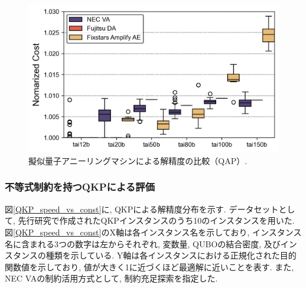 \documentclass[submit,techrep,noauthor]{ipsj}
\begin{document}


\begin{figure}[hb]
\centering
\includegraphics[bb=0 0 700 230, width=15cm]{speed_vs_constraint_QAP.png}
\caption{擬似量子アニーリングマシンによる解精度の比較（QAP）.}
\label{QAP_speed_vs_const}
\end{figure}

\subsubsection{不等式制約を持つQKPによる評価}
図\ref{QKP_speed_vs_const}に, QKPによる解精度分布を示す. データセットとして, 先行研究\cite{qkplib}で作成されたQKPインスタンスのうち10のインスタンスを用いた. 図\ref{QKP_speed_vs_const}のX軸は各インスタンス名を示しており, インスタンス名に含まれる3つの数字は左からそれぞれ, 変数量, QUBOの結合密度, 及びインスタンスの種類を示している. Y軸は各インスタンスにおける正規化された目的関数値を示しており, 値が大きく1に近づくほど最適解に近いことを表す. また, NEC VAの制約活用方式として, 制約充足探索を指定した. 
\end{document}
